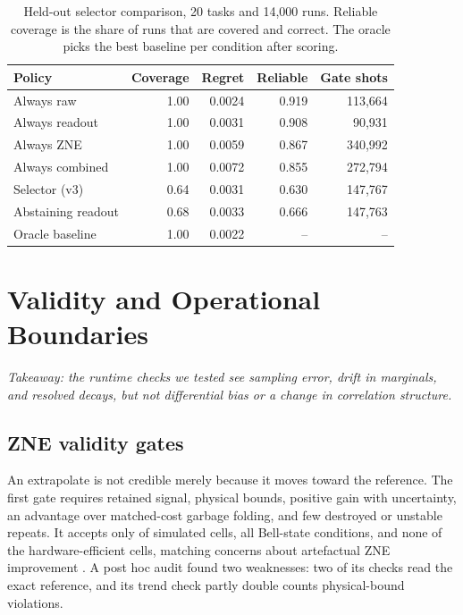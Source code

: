 \documentclass[10pt,twocolumn]{article}
\begin{document}
\begin{table}[t]
\centering
\caption{Held-out selector comparison, 20 tasks and 14,000 runs. Reliable coverage is the share of
runs that are covered and correct. The oracle picks the best baseline per condition after scoring.}
\label{tab:selector3}
\footnotesize
\setlength{\tabcolsep}{3pt}
\begin{tabular}{@{}lrrrr@{}}
\toprule
Policy & Coverage & Regret & Reliable & Gate shots\\
\midrule
Always raw & 1.00 & 0.0024 & 0.919 & 113,664\\
Always readout & 1.00 & 0.0031 & 0.908 & 90,931\\
Always ZNE & 1.00 & 0.0059 & 0.867 & 340,992\\
Always combined & 1.00 & 0.0072 & 0.855 & 272,794\\
Selector (v3) & 0.64 & 0.0031 & 0.630 & 147,767\\
Abstaining readout & 0.68 & 0.0033 & 0.666 & 147,763\\
Oracle baseline & 1.00 & 0.0022 & -- & --\\
\bottomrule
\end{tabular}
\end{table}

\section{Validity and Operational Boundaries}
\label{sec:boundaries}
\emph{Takeaway: the runtime checks we tested see sampling error, drift in marginals, and resolved
decays, but not differential bias or a change in correlation structure.}

\subsection{ZNE validity gates}
An extrapolate is not credible merely because it moves toward the reference. The first gate
requires retained signal, physical bounds, positive gain with uncertainty, an advantage over
matched-cost garbage folding, and few destroyed or unstable repeats. It accepts only
\ZNECredibleCells{} of \ZNEValidityCells{} simulated cells, all Bell-state conditions, and none of
the \ZNEHardwareCells{} hardware-efficient cells, matching concerns about artefactual ZNE
improvement \cite{koster2026}. A post hoc audit found two weaknesses: two of its checks read the
exact reference, and its trend check partly double counts physical-bound violations.
\end{document}

